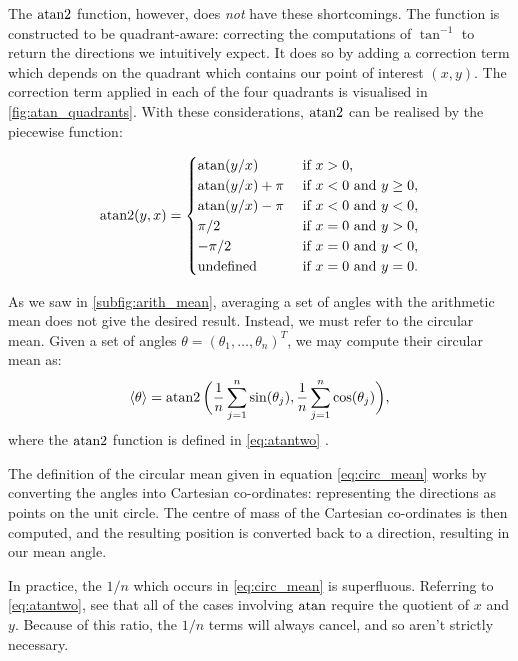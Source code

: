 The $\operatorname{atan2}$ function, however, does \emph{not} have these shortcomings. The
function is constructed to be quadrant-aware: correcting the computations of
$\tan^{-1}$ to return the directions we intuitively expect. It does so by
adding a correction term which depends on the quadrant which contains our point
of interest $(x, y)$. The correction term applied in each of the four quadrants
is visualised in \cref{fig:atan_quadrants}. With these considerations,
$\operatorname{atan2}$ can be realised by the piecewise function:

\begin{equation}
\label{eq:atantwo}
	\atantwo(y, x) = 
	\begin{cases}
		\atan(y/x)          & \text{ if } x > 0, \\
		\atan(y/x) + \pi    & \text{ if } x < 0 \text{ and } y \geq 0, \\
		\atan(y/x) - \pi    & \text{ if } x < 0 \text{ and } y < 0, \\
		\pi/2               & \text{ if } x = 0 \text{ and } y > 0, \\
		-\pi/2              & \text{ if } x = 0 \text{ and } y < 0, \\
		\text{undefined}    & \text{ if } x = 0 \text{ and } y = 0. \\
	\end{cases}
\end{equation}

As we saw in \cref{subfig:arith_mean}, averaging a set of angles with the
arithmetic mean does not give the desired result. Instead, we must refer to the
circular mean. Given a set of angles $\theta = (\theta_1, \ldots, \theta_n)^T$,
we may compute their circular mean as:
\begin{equation}
	\label{eq:circ_mean}
	\langle \theta \rangle = \operatorname{atan2}\bigg(\frac{1}{n} \sum_{j=1}^n \sin(\theta_j), \frac{1}{n} 
    \sum_{j=1}^n \cos(\theta_j)\bigg),
\end{equation}
where the $\operatorname{atan2}$ function is defined in \cref{eq:atantwo}
\parencite{fisher95}.

The definition of the circular mean given in equation \cref{eq:circ_mean} works
by converting the angles into Cartesian co-ordinates: representing the
directions as points on the unit circle. The centre of mass of the Cartesian
co-ordinates is then computed, and the resulting position is converted back to
a direction, resulting in our mean angle.

In practice, the $1 / n$ which occurs in \cref{eq:circ_mean} is superfluous.
Referring to \cref{eq:atantwo}, see that all of the cases involving $\atan$
require the quotient of $x$ and $y$. Because of this ratio, the $1 / n$ terms
will always cancel, and so aren't strictly necessary.

